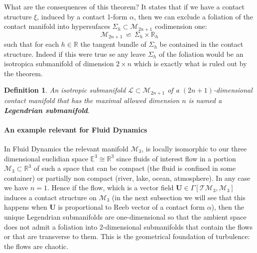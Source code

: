 \documentclass[10pt,a4paper]{article}
\newtheorem{definizione}{Definition}[section]
\begin{document}
\par
What are the consequences of this theorem? It states that
if we have a contact structure $\xi$, induced by a contact 1-form
 $\alpha$, then we can exclude  a foliation of the contact manifold
into hypersufaces $\Sigma_h \subset
\mathcal{M}_{2n+1}$  codimension one:
\begin{equation}\label{sfoliazione}
  \mathcal{M}_{2n+1}\, \backsimeq \, \Sigma_h \times \mathbb{R}_h
\end{equation}
such that for each $h\in \mathbb{R}$ the tangent bundle of
$\Sigma_h$ be contained in the contact structure. Indeed if this were true se
any leave  $\Sigma_h$ of the foliation would be an
 isotropica submanifold of dimension $2\times n$ which is exactly what is ruled out by the theorem.
\begin{definizione}
\label{leggiadro} An isotropic  submanifold $\mathcal{L}
\subset \mathcal{M}_{2n+1}$ of a $(2n+1)$-dimensional  contact manifold that has the maximal allowed dimension
 $n$ is named  a
\textbf{Legendrian submanifold}.
\end{definizione}
\paragraph{\sc An example relevant for Fluid Dynamics} In Fluid Dynamics
the relevant manifold $\mathcal{M}_3$,
 is locally isomorphic to our three dimensional euclidian space $\mathbb{E}^3 \cong \mathbb{R}^3$  since fluids of interest flow in a portion
$\mathcal{M}_3 \subset \mathbb{R}^3$ of such a space
that can be compact
(the fluid is  confined in some container) or partially non
compact (river, lake, ocean, atmosphere). In any case we have $n=1$.
Hence if the flow, which is a vector field
$\mathbf{U}\in \Gamma\left[\mathcal{TM}_3,\mathcal{M}_3\right]$
induces a contact structure on  $\mathcal{M}_3$ (in the next subsection
we will see that this happens when  $\mathbf{U}$
is proportional to Reeb vector  of a contact form
$\alpha$), then the unique  Legendrian submanifolds are one-dimensional
so that the ambient space does not admit a foliation into 2-dimensional submanifolds
that contain the flows or that are transverse to them. This is the geometrical foundation
 of turbulence: the flows are chaotic.
\end{document}
